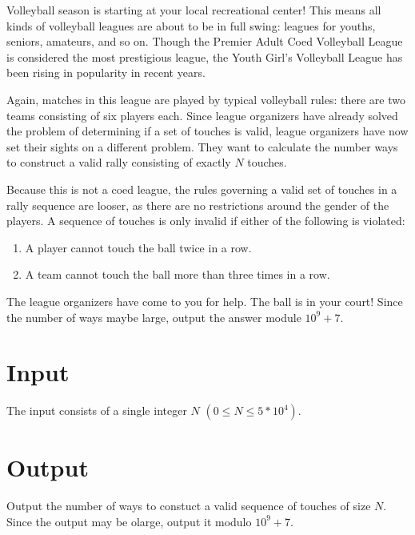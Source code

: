 
Volleyball season is starting at your local recreational center! This means all kinds of volleyball
leagues are about to be in full swing: leagues for youths, seniors, amateurs, and so on. Though the
Premier Adult Coed Volleyball League is considered the most prestigious league, the Youth Girl's
Volleyball League has been rising in popularity in recent years.

Again, matches in this league are played by typical volleyball rules: there are two teams consisting of six
players each. Since league organizers have already solved the problem of determining if a set of touches is
valid, league organizers have now set their sights on a different problem. They want to
calculate the number ways to construct a valid rally consisting of exactly $N$ touches.

Because this is not a coed league, the rules governing a valid set of touches in a rally sequence 
are looser, as there are no restrictions around the gender of the players. A sequence of touches is only
invalid if either of the following is violated:

\begin{enumerate}
    \item A player cannot touch the ball twice in a row.
    \item A team cannot touch the ball more than three times in a row.
\end{enumerate}

The league organizers have come to you for help. The ball is in your court! Since the number of ways
maybe large, output the answer module $10^9 + 7$.

\section*{Input}

The input consists of a single integer $N$ $(0 \leq N \leq 5 * 10^4)$.

\section*{Output}

Output the number of ways to constuct a valid sequence of touches of size $N$. Since the output may be
olarge, output it modulo $10^9 + 7$.
